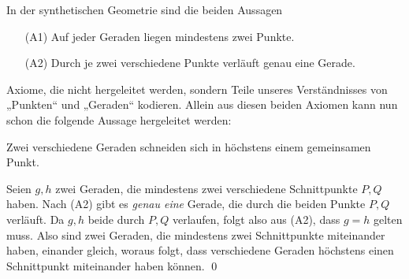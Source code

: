 \begin{bsp}[*]
 In der synthetischen Geometrie sind die beiden Aussagen
 \begin{itemize}
  \item[(A1)] Auf jeder Geraden liegen mindestens zwei Punkte.
  \item [(A2)] Durch je zwei verschiedene Punkte verläuft genau eine Gerade.
 \end{itemize}
Axiome, die nicht hergeleitet werden, sondern Teile unseres Verständnisses von „Punkten“ und „Geraden“ kodieren. Allein aus diesen beiden Axiomen kann nun schon die folgende Aussage hergeleitet werden:
\begin{sat}[*]
 Zwei verschiedene Geraden schneiden sich in höchstens einem gemeinsamen Punkt.
\end{sat}
\begin{bew}
 Seien $g,h$ zwei Geraden, die mindestens zwei verschiedene Schnittpunkte $P,Q$ haben. Nach (A2) gibt es \emph{genau eine} Gerade, die durch die beiden Punkte $P,Q$ verläuft. Da $g,h$ beide durch $P,Q$ verlaufen, folgt also aus (A2), dass $g=h$ gelten muss. Also sind zwei Geraden, die mindestens zwei Schnittpunkte miteinander haben, einander gleich, woraus folgt, dass verschiedene Geraden höchstens einen Schnittpunkt miteinander haben können. \qed
\end{bew}
\end{bsp}



